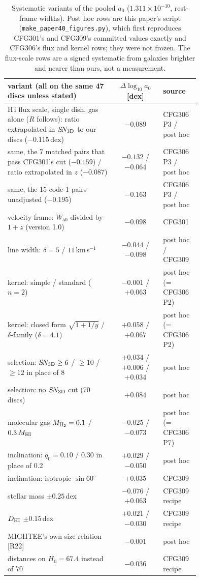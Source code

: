\documentclass[10pt]{article}
\newcommand{\fpath}[1]{\nolinkurl{#1}}
\begin{document}
\begin{table}[t]
\centering\footnotesize
\setlength{\tabcolsep}{4pt}
\begin{tabular}{L{0.56\linewidth}cL{0.19\linewidth}}
\toprule
variant (all on the same 47 discs unless stated) & $\Delta\log_{10}a_0$ [dex] & source \\
\midrule
H\,{\sc i} flux scale, single dish, gas alone ($R$ follows): ratio extrapolated in $S\!N_{\rm 3D}$ to our discs ($-0.115$\,dex) & $-0.089$ & CFG306 P3 / post hoc \\
same, the 7 matched pairs that pass CFG301's cut ($-0.159$) / ratio extrapolated in $z$ ($-0.087$) & $-0.132$ / $-0.064$ & CFG306 P3 / post hoc \\
same, the 15 code-1 pairs unadjusted ($-0.195$) & $-0.163$ & CFG306 P3 / post hoc \\
velocity frame: $W_{50}$ divided by $1+z$ (version 1.0) & $-0.098$ & CFG301 \\
line width: $\delta=5$ / $11$\,km\,s$^{-1}$ & $-0.044$ / $-0.098$ & post hoc / CFG309 \\
kernel: simple / standard ($n=2$) & $-0.001$ / $+0.063$ & post hoc (= CFG306 P2) \\
kernel: closed form $\sqrt{1+1/y}$ / $\delta$-family ($\delta=4.1$) & $+0.058$ / $+0.067$ & post hoc (= CFG306 P2) \\
selection: $S\!N_{\rm 3D}\ge6$ / $\ge10$ / $\ge12$ in place of 8 & $+0.034$ / $+0.006$ / $+0.034$ & post hoc \\
selection: no $S\!N_{\rm 3D}$ cut (70 discs) & $+0.084$ & post hoc \\
molecular gas $M_{\rm H_2}=0.1$ / $0.3\,M_{\rm HI}$ & $-0.025$ / $-0.073$ & post hoc (= CFG306 P7) \\
inclination: $q_0=0.10$ / $0.30$ in place of 0.2 & $+0.029$ / $-0.050$ & post hoc \\
inclination: isotropic $\sin60^\circ$ & $+0.035$ & CFG309 \\
stellar mass $\pm0.25$\,dex & $-0.076$ / $+0.063$ & CFG309 recipe \\
$D_{\rm HI}$ $\pm0.15$\,dex & $+0.021$ / $-0.030$ & CFG309 recipe \\
MIGHTEE's own size relation [R22] & $-0.001$ & post hoc \\
distances on $H_0=67.4$ instead of 70 & $-0.036$ & CFG309 recipe \\
\bottomrule
\end{tabular}
\caption{Systematic variants of the pooled $a_0$ ($1.311\times10^{-10}$, rest-frame widths). Post hoc rows are this paper's script (\fpath{make_paper40_figures.py}), which first reproduces CFG301's and CFG309's committed values exactly and CFG306's flux and kernel rows; they were not frozen. The flux-scale rows are a signed systematic from galaxies brighter and nearer than ours, not a measurement.}
\label{tab:sys}
\end{table}
\end{document}

